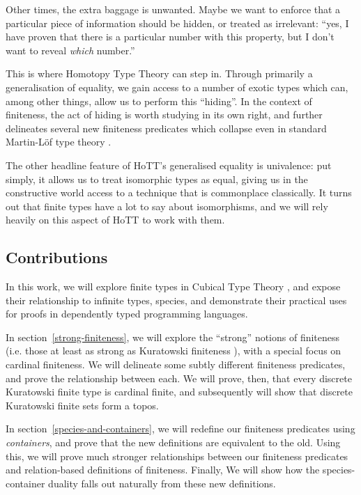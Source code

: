 Other times, the extra baggage is unwanted.
Maybe we want to enforce that a particular piece of information should be
hidden, or treated as irrelevant: ``yes, I have proven that there is a
particular number with this property, but I don't want to reveal \emph{which}
number.''

This is where Homotopy Type Theory \cite{hottbook} can step in.
Through primarily a generalisation of equality, we gain access to a number of
exotic types which can, among other things, allow us to perform this ``hiding''.
In the context of finiteness, the act of hiding is worth studying in its own
right, and further delineates several new finiteness predicates which collapse
even in standard Martin-Löf type theory
\cite{martin-lofIntuitionisticTypeTheory1980}.

The other headline feature of HoTT's generalised equality is univalence: put
simply, it allows us to treat isomorphic types as equal, giving us in the
constructive world access to a technique that is commonplace classically.
It turns out that finite types have a lot to say about isomorphisms, and we will
rely heavily on this aspect of HoTT to work with them.
\subsection{Contributions}
In this work, we will explore finite types in Cubical Type Theory
\cite{cohenCubicalTypeTheory2016}, and expose their relationship to infinite
types, species, and demonstrate their practical uses for proofs in dependently
typed programming languages.

In section~\ref{strong-finiteness}, we will explore the ``strong'' notions of
finiteness (i.e. those at least as strong as Kuratowski finiteness
\cite{kuratowskiNotionEnsembleFini1920}), with a special focus on cardinal
finiteness.
We will delineate some subtly different finiteness predicates, and prove the
relationship between each.
We will prove, then, that every discrete Kuratowski finite type is cardinal
finite, and subsequently will show that discrete Kuratowski finite sets form a
topos.

In section~\ref{species-and-containers}, we will redefine our finiteness
predicates using \emph{containers}, and prove that the new definitions are
equivalent to the old.
Using this, we will prove much stronger relationships between our finiteness
predicates and relation-based definitions of finiteness.
Finally, We will show how the species-container duality falls out naturally from
these new definitions.

